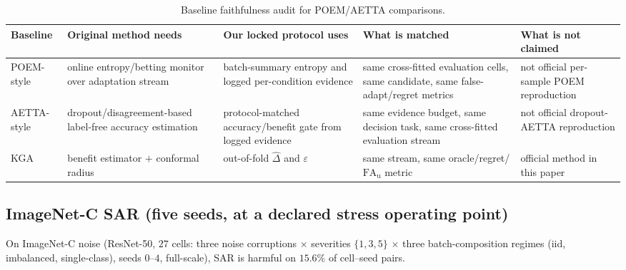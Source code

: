 \begin{table}[t]\centering\footnotesize
\setlength{\tabcolsep}{4pt}
\caption{Baseline faithfulness audit for POEM/AETTA comparisons.}
\label{tab:baseline-faithfulness}
\begin{tabular}{@{}p{}p{}p{}p{}p{}@{}}
\toprule
Baseline & Original method needs & Our locked protocol uses & What is matched & What is not claimed \\
\midrule
POEM-style & online entropy/betting monitor over adaptation stream & batch-summary entropy and logged per-condition evidence & same cross-fitted evaluation cells, same candidate, same false-adapt/regret metrics & not official per-sample POEM reproduction \\
AETTA-style & dropout/disagreement-based label-free accuracy estimation & protocol-matched accuracy/benefit gate from logged evidence & same evidence budget, same decision task, same cross-fitted evaluation stream & not official dropout-AETTA reproduction \\
\textsc{KGA} & benefit estimator $+$ conformal radius & out-of-fold $\widehat\Delta$ and $\varepsilon$ & same stream, same oracle/regret/$\mathrm{FA}_{\mathrm u}$ metric & official method in this paper \\
\bottomrule
\end{tabular}
\end{table}

\subsection{ImageNet-C SAR (five seeds, at a declared stress operating point)}\label{sec:imagenetc}
On ImageNet-C noise (ResNet-50, $27$ cells: three noise corruptions $\times$ severities
$\{1,3,5\}$ $\times$ three batch-composition regimes (iid, imbalanced, single-class), seeds
$0$--$4$, full-scale), SAR is harmful on $15.6\%$ of cell--seed pairs.

